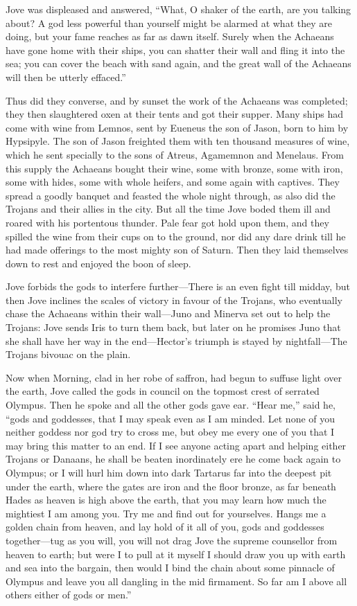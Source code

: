 Jove was displeased and answered, “What, O shaker of the earth, are you
talking about? A god less powerful than yourself might be alarmed at what
they are doing, but your fame reaches as far as dawn itself. Surely when
the Achaeans have gone home with their ships, you can shatter their wall
and fling it into the sea; you can cover the beach with sand again, and
the great wall of the Achaeans will then be utterly effaced.”

Thus did they converse, and by sunset the work of the Achaeans was
completed; they then slaughtered oxen at their tents and got their supper.
Many ships had come with wine from Lemnos, sent by Eueneus the son of
Jason, born to him by Hypsipyle. The son of Jason freighted them with ten
thousand measures of wine, which he sent specially to the sons of Atreus,
Agamemnon and Menelaus. From this supply the Achaeans bought their wine,
some with bronze, some with iron, some with hides, some with whole
heifers, and some again with captives. They spread a goodly banquet and
feasted the whole night through, as also did the Trojans and their allies
in the city. But all the time Jove boded them ill and roared with his
portentous thunder. Pale fear got hold upon them, and they spilled the
wine from their cups on to the ground, nor did any dare drink till he had
made offerings to the most mighty son of Saturn. Then they laid themselves
down to rest and enjoyed the boon of sleep.


Jove forbids the gods to interfere further—There is an even fight
till midday, but then Jove inclines the scales of victory in favour of the
Trojans, who eventually chase the Achaeans within their wall—Juno
and Minerva set out to help the Trojans: Jove sends Iris to turn them
back, but later on he promises Juno that she shall have her way in the end—Hector’s
triumph is stayed by nightfall—The Trojans bivouac on the plain.

Now when Morning, clad in her robe of saffron, had begun to suffuse light
over the earth, Jove called the gods in council on the topmost crest of
serrated Olympus. Then he spoke and all the other gods gave ear. “Hear
me,” said he, “gods and goddesses, that I may speak even as I am minded.
Let none of you neither goddess nor god try to cross me, but obey me every
one of you that I may bring this matter to an end. If I see anyone acting
apart and helping either Trojans or Danaans, he shall be beaten
inordinately ere he come back again to Olympus; or I will hurl him down
into dark Tartarus far into the deepest pit under the earth, where the
gates are iron and the floor bronze, as far beneath Hades as heaven is
high above the earth, that you may learn how much the mightiest I am among
you. Try me and find out for yourselves. Hangs me a golden chain from
heaven, and lay hold of it all of you, gods and goddesses together—tug
as you will, you will not drag Jove the supreme counsellor from heaven to
earth; but were I to pull at it myself I should draw you up with earth and
sea into the bargain, then would I bind the chain about some pinnacle of
Olympus and leave you all dangling in the mid firmament. So far am I above
all others either of gods or men.”

